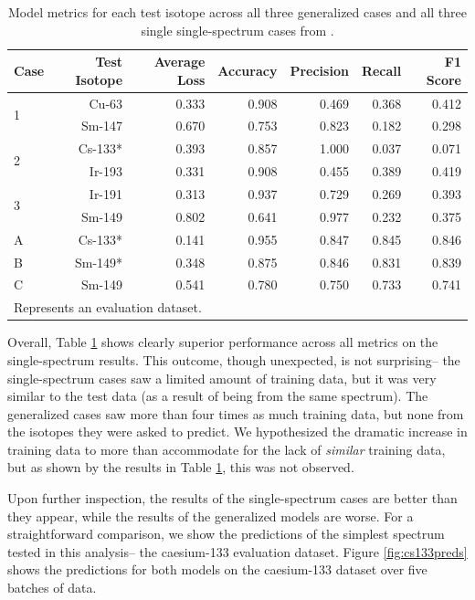 \documentclass{style/nseJournal}
\begin{document}
\begin{table}[h]
    \caption{Model metrics for each test isotope across all three generalized cases and all three single single-spectrum cases from \cite{PHYSOR}.}
    \centering
    \begin{tabular}{lrrrrrr}
        \toprule
    Case & Test Isotope & Average Loss & Accuracy & Precision & Recall & F1 Score \\
    \midrule
    \multirow{2}{*}{1} & Cu-63 & 0.333 & 0.908 & 0.469 & 0.368 & 0.412 \\
                       & Sm-147 & 0.670 & 0.753 & 0.823 & 0.182 & 0.298 \\
    \hline
    \multirow{2}{*}{2} & Cs-133* & 0.393 & 0.857 & 1.000 & 0.037 & 0.071 \\
                       & Ir-193 &0.331 & 0.908 & 0.455 & 0.389 & 0.419 \\
    \hline
    \multirow{2}{*}{3} & Ir-191 & 0.313 & 0.937 & 0.729 & 0.269 & 0.393 \\
                       & Sm-149 & 0.802 & 0.641 & 0.977 & 0.232 & 0.375 \\
    \midrule
    \multirow{1}{*}{A} & Cs-133* & 0.141 & 0.955 & 0.847 & 0.845 & 0.846 \\
    \hline
    \multirow{1}{*}{B} & Sm-149* & 0.348 & 0.875 & 0.846 & 0.831 & 0.839 \\
    \hline
    \multirow{1}{*}{C} & Sm-149 & 0.541 & 0.780 & 0.750 & 0.733 & 0.741 \\

    \bottomrule
    \multicolumn{4}{l}{\small *Represents an evaluation dataset.} \\
    \end{tabular}
    \label{tab:all_results}
\end{table}


Overall, Table \ref{tab:all_results} shows clearly superior performance across all metrics on the single-spectrum results. This outcome, though unexpected, is not surprising-- the single-spectrum cases saw a limited amount of training data, but it was very similar to the test data (as a result of being from the same spectrum). The generalized cases saw more than four times as much training data, but none from the isotopes they were asked to predict. We hypothesized the dramatic increase in training data to more than accommodate for the lack of \textit{similar} training data, but as shown by the results in Table \ref{tab:all_results}, this was not observed.

Upon further inspection, the results of the single-spectrum cases are better than they appear, while the results of the generalized models are worse. For a straightforward comparison, we show the predictions of the simplest spectrum tested in this analysis-- the caesium-133 evaluation dataset. Figure \ref{fig:cs133preds} shows the predictions for both models on the caesium-133 dataset over five batches of data. 
\end{document}
